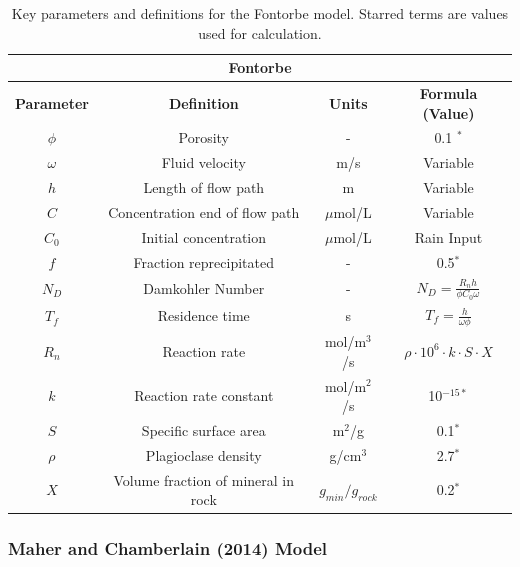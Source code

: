 \begin{table}[H]
    \centering
    \renewcommand{\arraystretch}{1.3} %
    \begin{tabular}{|c|c|c|c|}
        \hline
        \multicolumn{4}{|c|}{\textbf{Fontorbe}} \\  
        \hline
        \textbf{Parameter} & \textbf{Definition} & \textbf{Units} & \textbf{Formula (Value)} \\  
        \hline
        $\phi$ & Porosity & - & 0.1 $^*$\\
        $\omega$ & Fluid velocity & m/s & Variable \\
        $h$ & Length of flow path & m & Variable \\
        $C$ & Concentration \@ end of flow path & $\mu$mol/L & Variable \\
        $C_0$ & Initial concentration & $\mu$mol/L & Rain Input \\
        $f$ & Fraction reprecipitated & - & 0.5$^*$ \\
        $N_D$ & Damkohler Number & - & $N_D = \frac{R_n h}{\phi C_0 \omega}$ \\
        $T_f$ & Residence time & s & $T_f = \frac{h}{\omega\phi}$ \\
        $R_n$ & Reaction rate & mol/m$^3$/s & $\rho \cdot 10^6 \cdot k \cdot S \cdot X $ \\
        $k$ & Reaction rate constant & mol/m$^2$/s & 10$^{-15*}$ \\
        $S$ & Specific surface area & m$^2$/g & 0.1$^*$ \\
        $\rho$ & Plagioclase density & g/cm$^3$ & 2.7$^*$ \\
        $X$ & Volume fraction of mineral in rock & $g_{min}/g_{rock}$ & 0.2$^*$ \\
        \hline
    \end{tabular}
    \caption{Key parameters and definitions for the Fontorbe model. Starred terms are values used for calculation.}
    \label{tab:parameters1}
\end{table}


\FloatBarrier









\newpage




\subsubsection*{Maher and Chamberlain (2014) Model}


